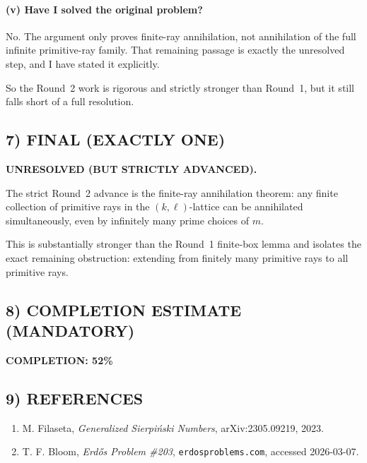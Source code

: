 \paragraph{(v) Have I solved the original problem?}
No. The argument only proves finite-ray annihilation, not annihilation of the full infinite primitive-ray family. That remaining passage is exactly the unresolved step, and I have stated it explicitly.

So the Round~2 work is rigorous and strictly stronger than Round~1, but it still falls short of a full resolution.

\subsection*{7) FINAL (EXACTLY ONE)}

\textbf{UNRESOLVED (BUT STRICTLY ADVANCED).}

The strict Round~2 advance is the finite-ray annihilation theorem: any finite collection of primitive rays in the $(k,\ell)$-lattice can be annihilated simultaneously, even by infinitely many prime choices of $m$.

This is substantially stronger than the Round~1 finite-box lemma and isolates the exact remaining obstruction: extending from finitely many primitive rays to all primitive rays.

\subsection*{8) COMPLETION ESTIMATE (MANDATORY)}

\textbf{COMPLETION: 52\%}

\subsection*{9) REFERENCES}

\begin{enumerate}
\item M. Filaseta, \emph{Generalized Sierpi\'nski Numbers}, arXiv:2305.09219, 2023.
\item T. F. Bloom, \emph{Erd\H{o}s Problem \#203}, \texttt{erdosproblems.com}, accessed 2026-03-07.
\end{enumerate}

